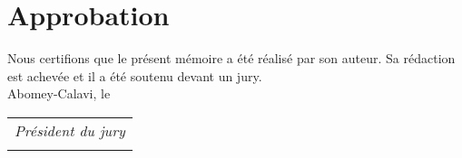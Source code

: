 \chapter*{Approbation}

\large{
\begin{center}
    Nous certifions que le présent mémoire a été réalisé par son auteur. Sa rédaction est achevée et il a été soutenu devant un jury. \\\vfill
    Abomey-Calavi, le \\\vfill
    \begin{tabular}{c}
        \emph{Président du jury} \\
        \\ 
    \end{tabular}
    \vfill
\end{center}}